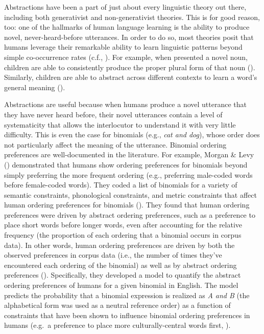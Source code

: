 \documentclass[
  nottoc]{article}
\begin{document}
Abstractions have been a part of just about every linguistic theory out
there, including both generativist and non-generativist theories. This
is for good reason, too: one of the hallmarks of human language learning
is the ability to produce novel, never-heard-before utterances. In order
to do so, most theories posit that humans leverage their remarkable
ability to learn linguistic patterns beyond simple co-occurrence rates
(c.f., ). For example, when
presented a novel noun, children are able to consistently produce the
proper plural form of that noun ().
Similarly, children are able to abstract across different contexts to
learn a word's general meaning ().

Abstractions are useful because when humans produce a novel utterance
that they have never heard before, their novel utterances contain a
level of systematicity that allows the interlocutor to understand it
with very little difficulty. This is even the case for binomials (e.g.,
\emph{cat and dog}), whose order does not particularly affect the
meaning of the utterance. Binomial ordering preferences are
well-documented in the literature. For example, Morgan \& Levy
() demonstrated
that humans show ordering preferences for binomials beyond simply
preferring the more frequent ordering (e.g., preferring male-coded words
before female-coded words). They coded a list of binomials for a variety
of semantic constraints, phonological constraints, and metric
constraints that affect human ordering preferences for binomials
().
They found that human ordering preferences were driven by abstract
ordering preferences, such as a preference to place short words before
longer words, even after accounting for the relative frequency (the
proportion of each ordering that a binomial occurs in corpus data). In
other words, human ordering preferences are driven by both the observed
preferences in corpus data (i.e., the number of times they've
encountered each ordering of the binomial) as well as by abstract
ordering preferences
(). Specifically, they developed a model to quantify the abstract
ordering preferences of humans for a given binomial in English. The
model predicts the probability that a binomial expression is realized as
\emph{A and B} (the alphabetical form was used as a neutral reference
order) as a function of constraints that have been shown to influence
binomial ordering preferences in humans (e.g.~a preference to place more
culturally-central words first,
).
\end{document}
